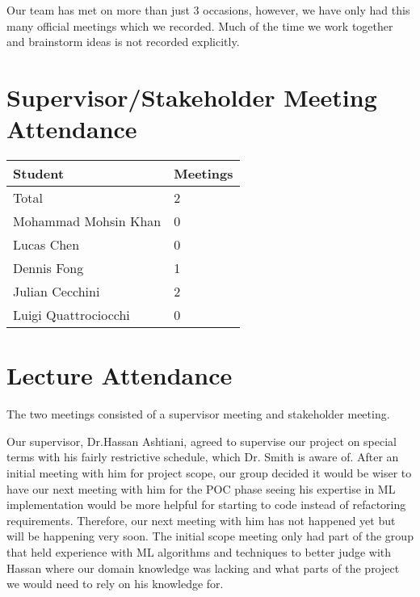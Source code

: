 \documentclass{article}
\begin{document}
Our team has met on more than just 3 occasions, however, we have only
had this many official meetings which we recorded. Much of the time
we work together and brainstorm ideas is not recorded explicitly.

\section{Supervisor/Stakeholder Meeting Attendance}


\begin{table}[H]
\centering
\begin{tabular}{ll}
\toprule
\textbf{Student} & \textbf{Meetings}\\
\midrule
Total & 2\\
Mohammad Mohsin Khan & 0\\
Lucas Chen & 0\\
Dennis Fong & 1\\
Julian Cecchini & 2\\
Luigi Quattrociocchi & 0\\
\bottomrule
\end{tabular}
\end{table}


\section{Lecture Attendance}

The two meetings consisted of a supervisor meeting and stakeholder meeting. 

Our supervisor, Dr.Hassan Ashtiani, agreed to supervise our project on special terms with his 
fairly restrictive schedule, which Dr. Smith is aware of. After an initial meeting with 
him for project scope, our group decided it would be wiser to have our next meeting with him 
for the POC phase seeing his expertise in ML implementation would be more helpful for starting
to code instead of refactoring requirements. Therefore, our next meeting with him has not happened
yet but will be happening very soon. The initial scope meeting only had part of the group that
held experience with ML algorithms and techniques to better judge with Hassan where our domain 
knowledge was lacking and what parts of the project we would need to rely on his knowledge for.
\end{document}
